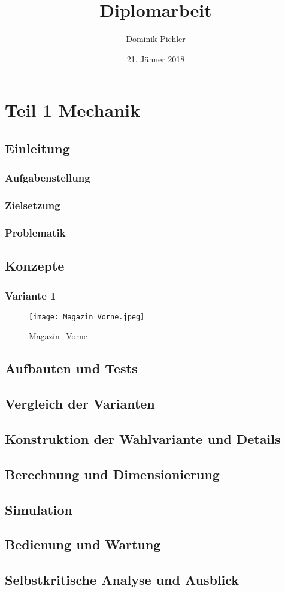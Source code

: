 \documentclass[a4paper,12pt]{scrbook}
\title{Diplomarbeit}
\author{Dominik Pichler}
\date{21. Jänner 2018}
\begin{document}
\maketitle
\tableofcontents

\section{Teil 1 Mechanik}
\subsection{Einleitung}
\subsubsection{Aufgabenstellung}
\subsubsection{Zielsetzung}
\subsubsection{Problematik}
\subsection{Konzepte}
\subsubsection{Variante 1}

\begin{figure}
\begin{center}
\texttt{[image: Magazin\_Vorne.jpeg]}
\caption{Magazin_Vorne}
\end{center}
\end{figure}

\subsection{Aufbauten und Tests}
\subsection{Vergleich der Varianten}
\subsection{Konstruktion der Wahlvariante und Details}
\subsection{Berechnung und Dimensionierung}
\subsection{Simulation}
\subsection{Bedienung und Wartung}
\subsection{Selbstkritische Analyse und Ausblick}
\end{document}
